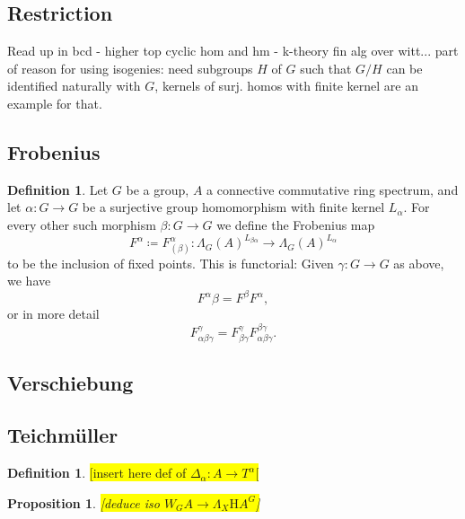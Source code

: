 \documentclass[10pt, a4paper, UKenglish]{article}
\numberwithin{equation}{section}
\newcommand{\defas}{\coloneqq}  %
\newcommand{\comm}[1]{\colorbox{yellow}{#1}}
\renewcommand{\H}{\mathrm{H}}
\theoremstyle{plain}
\newtheorem{prop}[equation]{Proposition}
\theoremstyle{definition}
\newtheorem{defn}[equation]{Definition}
\renewcommand{\to}{\longrightarrow}
\begin{document}
\subsection{Restriction}
Read up in bcd - higher top cyclic hom and  hm - k-theory fin alg over witt...
part of reason for using isogenies: need subgroups $H$ of $G$ such that $G/H$ can be identified naturally with $G$, kernels of surj. homos with finite kernel are an example for that.
\subsection{Frobenius}
\begin{defn}\label{def_frobenius_and_functoriality}
Let $G$ be a group, $A$ a connective commutative ring spectrum, and let $\alpha : G \to G$ be a surjective group homomorphism with finite kernel $L_\alpha$. For every other such morphism $\beta: G \to G$ we define the Frobenius map
\[ F^\alpha \defas F^\alpha_{(\beta)}: \Lambda_G(A)^{ L_{\beta\alpha} } \to \Lambda_G(A)^{ L_\alpha } \]
to be the inclusion of fixed points. This is functorial: Given $\gamma: G \to G$ as above, we have
\[ F^\alpha\beta = F^\beta F^\alpha, \]
or in more detail
\[ F^{\gamma}_{\alpha\beta\gamma} = F^{\gamma}_{\beta\gamma} F^{\beta\gamma}_{\alpha\beta\gamma}. \]

\end{defn}

\subsection{Verschiebung}
\subsection{Teichm\"uller}
\begin{defn}\label{def_Delta_alpha}\cite[Sec. 6.2]{brun2010covering}
\comm{[insert here def of $\Delta_\alpha: A \to T^\alpha$[}
\end{defn}
\begin{prop}\label{prop_iso_degree_0_structure_map_lambda}\cite[Prop. 6.2.4]{brun2010covering}
\comm{[deduce iso $W_G A \to \Lambda_{X} \H A ^G$]}
\end{prop}
\end{document}
